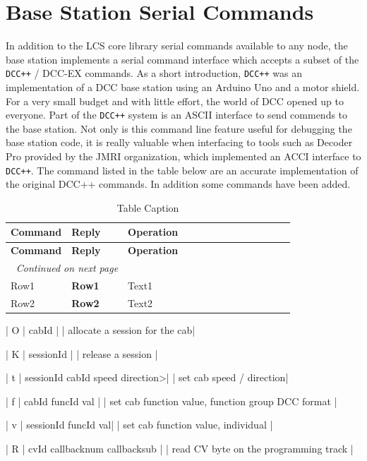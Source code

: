 \section{Base Station Serial Commands}

In addition to the LCS core library serial commands available to any node, the base station implements a serial command interface which accepts a subset of the \texttt{DCC++} / DCC-EX commands. As a short introduction, \texttt{DCC++} was an implementation of a DCC base station using an Arduino Uno and a motor shield. For a very small budget and with little effort, the world of DCC opened up to everyone. Part of the \texttt{DCC++} system is an ASCII interface to send commends to the base station. Not only is this command line feature useful for debugging the base station code, it is really valuable when interfacing to tools such as Decoder Pro provided by the JMRI organization, which implemented an ACCI interface to \texttt{DCC++}. The command listed in the table below are an accurate implementation of the original DCC++ commands. In addition some commands have been added.

\begin{longtable}{@{}|l|p{0.2\linewidth}p{0.6\linewidth}@{}}
    \caption{Table Caption} \\
    \toprule
    \textbf{Command} & \textbf{Reply} & \textbf{Operation}\\
    \midrule
    \endfirsthead
    \toprule
    \textbf{Command} & \textbf{Reply} & \textbf{Operation}\\
    \midrule
    \endhead
    \midrule
    \multicolumn{2}{r}{\textit{Continued on next page}} \\
    \midrule
    \endfoot
    \bottomrule
    \endlastfoot
    Row1 & \textbf{Row1} & Text1 \\
    \midrule
    Row2 & \textbf{Row2} & Text2 \\
\end{longtable}

| O | cabId | | allocate a session for the cab|

| K | sessionId | | release a session |

| t | sessionId cabId speed direction>| | set cab speed / direction|

| f | cabId funcId val | | set cab function value, function group DCC format |

| v | sessionId funcId val| | set cab function value, individual |

| R | cvId callbacknum callbacksub | | read CV byte on the programming track |


